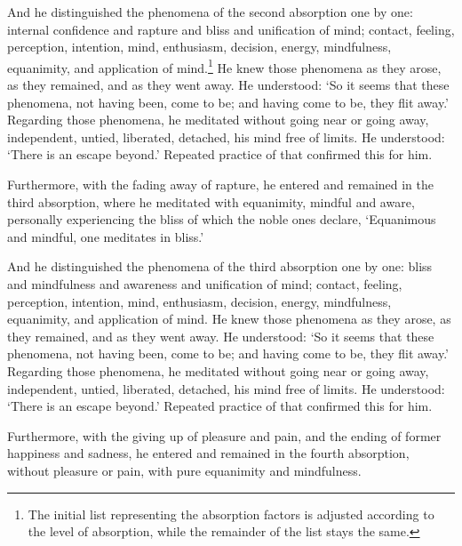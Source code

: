 \documentclass[12pt,openany]{book}%
\begin{document}
And he distinguished the phenomena of the second absorption one by one: internal confidence and rapture and bliss and unification of mind; contact, feeling, perception, intention, mind, enthusiasm, decision, energy, mindfulness, equanimity, and application of mind.\footnote{The initial list representing the absorption factors is adjusted according to the level of absorption, while the remainder of the list stays the same. } He knew those phenomena as they arose, as they remained, and as they went away. He understood: ‘So it seems that these phenomena, not having been, come to be; and having come to be, they flit away.’ Regarding those phenomena, he meditated without going near or going away, independent, untied, liberated, detached, his mind free of limits. He understood: ‘There is an escape beyond.’ Repeated practice of that confirmed this for him. 

Furthermore, with the fading away of rapture, he entered and remained in the third absorption, where he meditated with equanimity, mindful and aware, personally experiencing the bliss of which the noble ones declare, ‘Equanimous and mindful, one meditates in bliss.’ 

And he distinguished the phenomena of the third absorption one by one: bliss and mindfulness and awareness and unification of mind; contact, feeling, perception, intention, mind, enthusiasm, decision, energy, mindfulness, equanimity, and application of mind. He knew those phenomena as they arose, as they remained, and as they went away. He understood: ‘So it seems that these phenomena, not having been, come to be; and having come to be, they flit away.’ Regarding those phenomena, he meditated without going near or going away, independent, untied, liberated, detached, his mind free of limits. He understood: ‘There is an escape beyond.’ Repeated practice of that confirmed this for him. 

Furthermore, with the giving up of pleasure and pain, and the ending of former happiness and sadness, he entered and remained in the fourth absorption, without pleasure or pain, with pure equanimity and mindfulness. 
\end{document}
